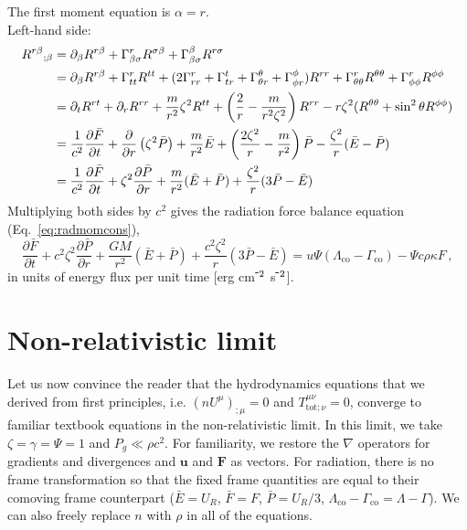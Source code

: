 \documentclass[../main.tex]{subfiles}
\begin{document}
\noindent The first moment equation is $\alpha=r$.\\
Left-hand side:
\begin{align*}
    R^{r\beta}{}_{;\beta}&=\partial_\beta R^{r\beta}+\Gamma^{r}_{\beta\sigma}R^{\sigma\beta}+\Gamma^{\beta}_{\beta\sigma}R^{r\sigma}\\
    &=\partial_\beta R^{r\beta}+\Gamma^{r}_{tt}R^{tt}+(2\Gamma^{r}_{rr}+\Gamma^{t}_{tr}+\Gamma^{\theta}_{
    \theta r}+\Gamma^{\phi}_{\phi r})R^{rr}+\Gamma^{r}_{\theta\theta}R^{\theta\theta}+\Gamma^{r}_{\phi\phi}R^{\phi\phi}\\
    &=\partial_t R^{rt}+\partial_r R^{rr}+\frac{m}{r^2}\zeta^2 R^{tt}+\left(\frac{2}{r}-\frac{m}{r^2\zeta^2}\right)R^{rr}-r\zeta^2(R^{\theta\theta}+\sin^2\theta R^{\phi\phi})\\
    &=\frac{1}{c^2}\frac{\partial\bar{F}}{\partial t}+\frac{\partial}{\partial r}\left(\zeta^2\bar{P}\right)+\frac{m}{r^2}\bar{E}+\left(\frac{2\zeta^2}{r}-\frac{m}{r^2}\right)\bar{P}-\frac{\zeta^2}{r}(\bar{E}-\bar{P})\\
    &=\frac{1}{c^2}\frac{\partial\bar{F}}{\partial t}+\zeta^2\frac{\partial\bar{P}}{\partial r}+\frac{m}{r^2}(\bar{E}+\bar{P})+\frac{\zeta^2}{r}(3\bar{P}-\bar{E})
\end{align*}
Multiplying both sides by $c^2$ gives the radiation force balance equation (Eq.~\ref{eq:radmomcons}),
\begin{equation}
    \frac{\partial \bar{F}}{\partial t}+c^2\zeta^2\frac{\partial\bar{P}}{\partial r}+\frac{GM}{r^2}(\bar{E}+\bar{P})+\frac{c^2\zeta^2}{r}(3\bar{P}-\bar{E})=u\Psi(\Lambda_\text{co}-\Gamma_\text{co})-\Psi c\rho\kappa F\,,
\end{equation}
in units of energy flux per unit time [erg cm$^{\-2}$ s$^{\-2}$].


\section*{Non-relativistic limit}
Let us now convince the reader that the hydrodynamics equations that we derived from first principles, i.e. $(nU^\mu)_{;\mu}=0$ and $T^{\mu\nu}_{\text{tot};\nu}=0$, converge to familiar textbook equations in the non-relativistic limit. In this limit, we take $\zeta=\gamma=\Psi=1$ and $P_g\ll \rho c^2$.  For familiarity, we restore the $\nabla$ operators for gradients and divergences and $\bm{u}$ and $\bm{F}$ as vectors.  For radiation, there is no frame transformation so that the fixed frame quantities are equal to their comoving frame counterpart ($\bar{E}=U_R$, $\bar{F}=F$, $\bar{P}=U_R /3$, $\Lambda_\text{co}-\Gamma_\text{co}=\Lambda-\Gamma$).  We can also freely replace $n$ with $\rho$ in all of the equations.\\
\end{document}
